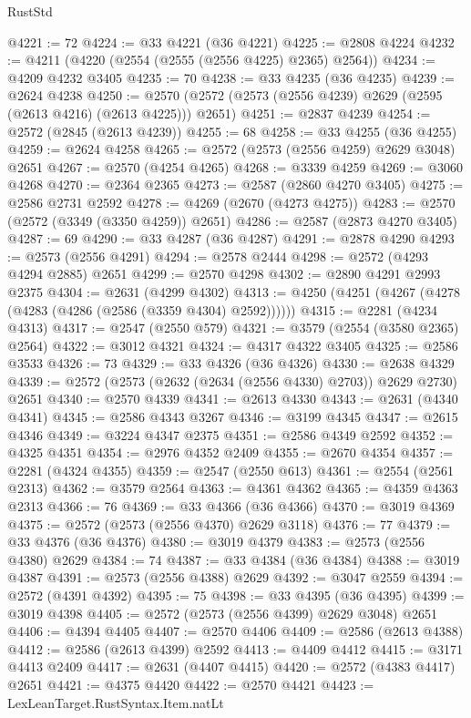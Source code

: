 \begin{lexlean}{RustStd}
\begin{coremodule}
@4221 := 72
@4224 := @33 @4221 (@36 @4221)
@4225 := @2808 @4224
@4232 := @4211 (@4220 (@2554 (@2555 (@2556 @4225) @2365) @2564))
@4234 := @4209 @4232 @3405
@4235 := 70
@4238 := @33 @4235 (@36 @4235)
@4239 := @2624 @4238
@4250 := @2570 (@2572 (@2573 (@2556 @4239) @2629 (@2595 (@2613 @4216) (@2613 @4225))) @2651)
@4251 := @2837 @4239
@4254 := @2572 (@2845 (@2613 @4239))
@4255 := 68
@4258 := @33 @4255 (@36 @4255)
@4259 := @2624 @4258
@4265 := @2572 (@2573 (@2556 @4259) @2629 @3048) @2651
@4267 := @2570 (@4254 @4265)
@4268 := @3339 @4259
@4269 := @3060 @4268
@4270 := @2364 @2365
@4273 := @2587 (@2860 @4270 @3405)
@4275 := @2586 @2731 @2592
@4278 := @4269 (@2670 (@4273 @4275))
@4283 := @2570 (@2572 (@3349 (@3350 @4259)) @2651)
@4286 := @2587 (@2873 @4270 @3405)
@4287 := 69
@4290 := @33 @4287 (@36 @4287)
@4291 := @2878 @4290
@4293 := @2573 (@2556 @4291)
@4294 := @2578 @2444
@4298 := @2572 (@4293 @4294 @2885) @2651
@4299 := @2570 @4298
@4302 := @2890 @4291 @2993 @2375
@4304 := @2631 (@4299 @4302)
@4313 := @4250 (@4251 (@4267 (@4278 (@4283 (@4286 (@2586 (@3359 @4304) @2592))))))
@4315 := @2281 (@4234 @4313)
@4317 := @2547 (@2550 @579)
@4321 := @3579 (@2554 (@3580 @2365) @2564)
@4322 := @3012 @4321
@4324 := @4317 @4322 @3405
@4325 := @2586 @3533
@4326 := 73
@4329 := @33 @4326 (@36 @4326)
@4330 := @2638 @4329
@4339 := @2572 (@2573 (@2632 (@2634 (@2556 @4330) @2703)) @2629 @2730) @2651
@4340 := @2570 @4339
@4341 := @2613 @4330
@4343 := @2631 (@4340 @4341)
@4345 := @2586 @4343 @3267
@4346 := @3199 @4345
@4347 := @2615 @4346
@4349 := @3224 @4347 @2375
@4351 := @2586 @4349 @2592
@4352 := @4325 @4351
@4354 := @2976 @4352 @2409
@4355 := @2670 @4354
@4357 := @2281 (@4324 @4355)
@4359 := @2547 (@2550 @613)
@4361 := @2554 (@2561 @2313)
@4362 := @3579 @2564
@4363 := @4361 @4362
@4365 := @4359 @4363 @2313
@4366 := 76
@4369 := @33 @4366 (@36 @4366)
@4370 := @3019 @4369
@4375 := @2572 (@2573 (@2556 @4370) @2629 @3118)
@4376 := 77
@4379 := @33 @4376 (@36 @4376)
@4380 := @3019 @4379
@4383 := @2573 (@2556 @4380) @2629
@4384 := 74
@4387 := @33 @4384 (@36 @4384)
@4388 := @3019 @4387
@4391 := @2573 (@2556 @4388) @2629
@4392 := @3047 @2559
@4394 := @2572 (@4391 @4392)
@4395 := 75
@4398 := @33 @4395 (@36 @4395)
@4399 := @3019 @4398
@4405 := @2572 (@2573 (@2556 @4399) @2629 @3048) @2651
@4406 := @4394 @4405
@4407 := @2570 @4406
@4409 := @2586 (@2613 @4388)
@4412 := @2586 (@2613 @4399) @2592
@4413 := @4409 @4412
@4415 := @3171 @4413 @2409
@4417 := @2631 (@4407 @4415)
@4420 := @2572 (@4383 @4417) @2651
@4421 := @4375 @4420
@4422 := @2570 @4421
@4423 := LexLeanTarget.RustSyntax.Item.natLt

\end{coremodule}
\end{lexlean}

